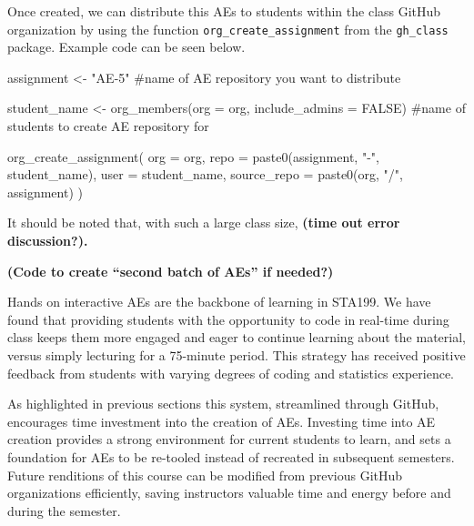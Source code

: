 \documentclass[
  12pt]{article}
\newenvironment{Shaded}{\begin{snugshade}}{\end{snugshade}}
\newcommand{\AttributeTok}[1]{\textcolor[rgb]{0.40,0.45,0.13}{#1}}
\newcommand{\CommentTok}[1]{\textcolor[rgb]{0.37,0.37,0.37}{#1}}
\newcommand{\ConstantTok}[1]{\textcolor[rgb]{0.56,0.35,0.01}{#1}}
\newcommand{\FunctionTok}[1]{\textcolor[rgb]{0.28,0.35,0.67}{#1}}
\newcommand{\NormalTok}[1]{\textcolor[rgb]{0.00,0.23,0.31}{#1}}
\newcommand{\OtherTok}[1]{\textcolor[rgb]{0.00,0.23,0.31}{#1}}
\newcommand{\StringTok}[1]{\textcolor[rgb]{0.13,0.47,0.30}{#1}}
\begin{document}
Once created, we can distribute this AEs to students within the class
GitHub organization by using the function
\texttt{org\_create\_assignment} from the \texttt{gh\_class} package.
Example code can be seen below.

\begin{Shaded}
\begin{Highlighting}[]
\NormalTok{assignment }\OtherTok{\textless{}{-}} \StringTok{"AE{-}5"} \CommentTok{\#name of AE repository you want to distribute }

\NormalTok{student\_name }\OtherTok{\textless{}{-}} \FunctionTok{org\_members}\NormalTok{(}\AttributeTok{org =}\NormalTok{ org, }\AttributeTok{include\_admins =} \ConstantTok{FALSE}\NormalTok{) }\CommentTok{\#name of students to create AE repository for}

\FunctionTok{org\_create\_assignment}\NormalTok{(}
  \AttributeTok{org =}\NormalTok{ org,}
  \AttributeTok{repo =} \FunctionTok{paste0}\NormalTok{(assignment, }\StringTok{"{-}"}\NormalTok{, student\_name),}
  \AttributeTok{user =}\NormalTok{ student\_name,}
  \AttributeTok{source\_repo =} \FunctionTok{paste0}\NormalTok{(org, }\StringTok{"/"}\NormalTok{, assignment)}
\NormalTok{)}
\end{Highlighting}
\end{Shaded}

It should be noted that, with such a large class size, \textbf{(time out
error discussion?).}

\textbf{(Code to create ``second batch of AEs'' if needed?)}

Hands on interactive AEs are the backbone of learning in STA199. We have
found that providing students with the opportunity to code in real-time
during class keeps them more engaged and eager to continue learning
about the material, versus simply lecturing for a 75-minute period. This
strategy has received positive feedback from students with varying
degrees of coding and statistics experience.

As highlighted in previous sections this system, streamlined through
GitHub, encourages time investment into the creation of AEs. Investing
time into AE creation provides a strong environment for current students
to learn, and sets a foundation for AEs to be re-tooled instead of
recreated in subsequent semesters. Future renditions of this course can
be modified from previous GitHub organizations efficiently, saving
instructors valuable time and energy before and during the semester.
\end{document}
